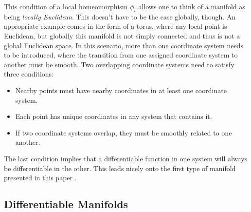 \documentclass[fleqn, twocolumn, 10pt]{article}
\begin{document}
This condition of a local homeomorphism $\phi_i$ allows one to think of a manifold as being \textit{locally Euclidean}. This doesn't have to be the case globally, though. An appropriate example comes in the form of a torus, where any local point is Euclidean, but globally this manifold is not simply connected and thus is not a global Euclidean space. In this scenario, more than one coordinate system needs to be introduced, where the transition from one assigned coordinate system to another must be smooth. Two overlapping coordinate systems need to satisfy three conditions:

\begin{itemize}
\item Nearby points must have nearby coordinates in at least one coordinate system.
\item Each point has unique coordinates in any system that contains it.
\item If two coordinate systems overlap, they must be smoothly related to one another.
\end{itemize}

The last condition implies that a differentiable function in one system will always be differentiable in the other. This leads nicely onto the first type of manifold presented in this paper \cite{nakahara2003geometry, sussman2013functional}.


\subsection{Differentiable Manifolds}
\end{document}
